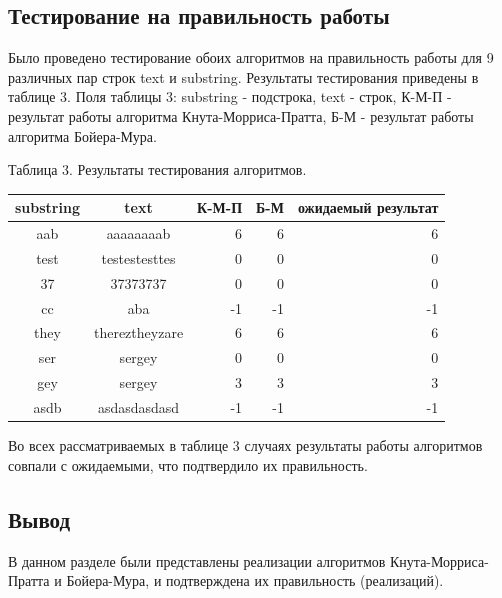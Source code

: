 \documentclass[a4paper, 14pt]{article}
\begin{document}
        
      
        
        

	\subsection{Тестирование на правильность работы}
	Было проведено тестирование обоих алгоритмов на правильность работы для 9 различных пар строк text и substring. Результаты тестирования приведены в таблице 3. Поля таблицы 3: substring - подстрока, text - строк, К-М-П - результат работы алгоритма Кнута-Морриса-Пратта, Б-М - результат работы алгоритма Бойера-Мура.\
	\newpage
	\begin{center}
	Таблица 3. Результаты тестирования алгоритмов.\\

	\begin{tabular}{| c | c | r | r | r |}
	\hline
	substring & text & К-М-П & Б-М & ожидаемый  результат\\ \hline
	aab & aaaaaaaab & 6 & 6 & 6	\\
	test & testestesttes & 0 & 0 & 0\\
	37 & 37373737 & 0 & 0 & 0\\
	cc & aba & -1 & -1 & -1\\
	they & thereztheyzare & 6 & 6 & 6\\
	ser & sergey & 0 & 0 & 0\\
	gey & sergey & 3 & 3 & 3\\
	asdb & asdasdasdasd & -1 & -1 & -1\\
	\hline
	
	\end{tabular}
		\end{center}
	Во всех рассматриваемых в таблице 3 случаях результаты работы алгоритмов совпали с ожидаемыми, что подтвердило их правильность. 
   \subsection{Вывод} 
   В данном разделе были представлены реализации алгоритмов Кнута-Морриса-Пратта и Бойера-Мура, и подтверждена их правильность (реализаций).
   \newpage
       	
\end{document}
